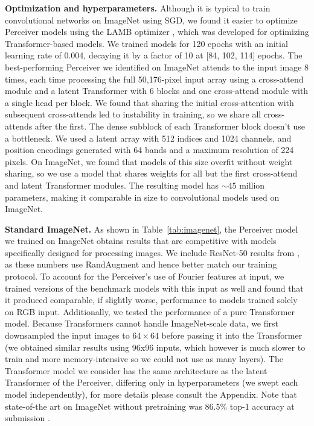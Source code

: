  \textbf{Optimization and hyperparameters.} Although it is typical to train convolutional networks on ImageNet using SGD, we found it easier to optimize Perceiver models using the LAMB optimizer \cite{you2020large}, which was developed for optimizing Transformer-based models. We trained models for 120 epochs with an initial learning rate of 0.004, decaying it by a factor of 10 at [84, 102, 114] epochs. The best-performing Perceiver we identified on ImageNet attends to the input image 8 times, each time processing the full 50,176-pixel input array using a cross-attend module and a latent Transformer with 6 blocks and one cross-attend module with a single head per block. We found that sharing the initial cross-attention with subsequent cross-attends led to instability in training, so we share all cross-attends after the first.  The dense subblock of each Transformer block doesn't use a bottleneck. We used a latent array with 512 indices and 1024 channels, and position encodings generated with 64 bands and a maximum resolution of 224 pixels. On ImageNet, we found that models of this size overfit without weight sharing, so we use a model that shares weights for all but the first cross-attend and latent Transformer modules. The resulting model has $\sim 45$ million parameters, making it comparable in size to convolutional models used on ImageNet.

 \textbf{Standard ImageNet.} As shown in Table~\ref{tab:imagenet}, the Perceiver model we trained on ImageNet obtains results that are competitive with models specifically designed for processing images. We include ResNet-50 results from \cite{cubuk2020randaugment}, as these numbers use RandAugment and hence better match our training protocol. To account for the Perceiver's use of Fourier features at input, we trained versions of the benchmark models with this input as well and found that it produced comparable, if slightly worse, performance to models trained solely on RGB input. Additionally, we tested the performance of a pure Transformer model. Because Transformers cannot handle ImageNet-scale data, we first downsampled the input images to $64 \times 64$ before passing it into the Transformer (we obtained similar results using 96x96 inputs, which however is much slower to train and more memory-intensive so we could not use as many layers). The Transformer model we consider has the same architecture as the latent Transformer of the Perceiver, differing only in hyperparameters (we swept each model independently), for more details please consult the Appendix. Note that state-of-the art on ImageNet without pretraining was 86.5\% top-1 accuracy at submission \cite{brock2021high}.

